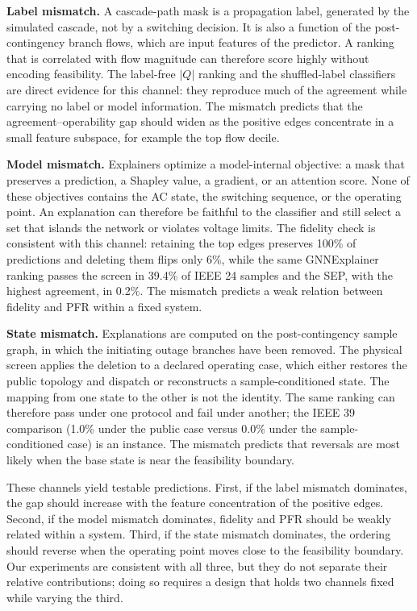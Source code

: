\textbf{Label mismatch.} A cascade-path mask is a propagation label, generated by the simulated cascade, not by a switching decision. It is also a function of the post-contingency branch flows, which are input features of the predictor. A ranking that is correlated with flow magnitude can therefore score highly without encoding feasibility. The label-free $|Q|$ ranking and the shuffled-label classifiers are direct evidence for this channel: they reproduce much of the agreement while carrying no label or model information. The mismatch predicts that the agreement--operability gap should widen as the positive edges concentrate in a small feature subspace, for example the top flow decile.

\textbf{Model mismatch.} Explainers optimize a model-internal objective: a mask that preserves a prediction, a Shapley value, a gradient, or an attention score. None of these objectives contains the AC state, the switching sequence, or the operating point. An explanation can therefore be faithful to the classifier and still select a set that islands the network or violates voltage limits. The fidelity check is consistent with this channel: retaining the top edges preserves 100\% of predictions and deleting them flips only 6\%, while the same GNNExplainer ranking passes the screen in 39.4\% of IEEE 24 samples and the SEP, with the highest agreement, in 0.2\%. The mismatch predicts a weak relation between fidelity and PFR within a fixed system.

\textbf{State mismatch.} Explanations are computed on the post-contingency sample graph, in which the initiating outage branches have been removed. The physical screen applies the deletion to a declared operating case, which either restores the public topology and dispatch or reconstructs a sample-conditioned state. The mapping from one state to the other is not the identity. The same ranking can therefore pass under one protocol and fail under another; the IEEE 39 comparison (1.0\% under the public case versus 0.0\% under the sample-conditioned case) is an instance. The mismatch predicts that reversals are most likely when the base state is near the feasibility boundary.

These channels yield testable predictions. First, if the label mismatch dominates, the gap should increase with the feature concentration of the positive edges. Second, if the model mismatch dominates, fidelity and PFR should be weakly related within a system. Third, if the state mismatch dominates, the ordering should reverse when the operating point moves close to the feasibility boundary. Our experiments are consistent with all three, but they do not separate their relative contributions; doing so requires a design that holds two channels fixed while varying the third.

